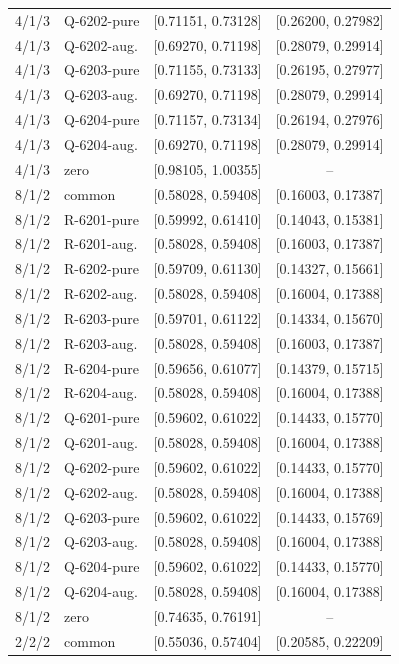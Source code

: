 {\begin{longtable}{rlcc}
4/1/3 & Q-6202-pure & [0.71151, 0.73128] & [0.26200, 0.27982] \\
4/1/3 & Q-6202-aug. & [0.69270, 0.71198] & [0.28079, 0.29914] \\
4/1/3 & Q-6203-pure & [0.71155, 0.73133] & [0.26195, 0.27977] \\
4/1/3 & Q-6203-aug. & [0.69270, 0.71198] & [0.28079, 0.29914] \\
4/1/3 & Q-6204-pure & [0.71157, 0.73134] & [0.26194, 0.27976] \\
4/1/3 & Q-6204-aug. & [0.69270, 0.71198] & [0.28079, 0.29914] \\
4/1/3 & zero & [0.98105, 1.00355] & -- \\
8/1/2 & common & [0.58028, 0.59408] & [0.16003, 0.17387] \\
8/1/2 & R-6201-pure & [0.59992, 0.61410] & [0.14043, 0.15381] \\
8/1/2 & R-6201-aug. & [0.58028, 0.59408] & [0.16003, 0.17387] \\
8/1/2 & R-6202-pure & [0.59709, 0.61130] & [0.14327, 0.15661] \\
8/1/2 & R-6202-aug. & [0.58028, 0.59408] & [0.16004, 0.17388] \\
8/1/2 & R-6203-pure & [0.59701, 0.61122] & [0.14334, 0.15670] \\
8/1/2 & R-6203-aug. & [0.58028, 0.59408] & [0.16003, 0.17387] \\
8/1/2 & R-6204-pure & [0.59656, 0.61077] & [0.14379, 0.15715] \\
8/1/2 & R-6204-aug. & [0.58028, 0.59408] & [0.16004, 0.17388] \\
8/1/2 & Q-6201-pure & [0.59602, 0.61022] & [0.14433, 0.15770] \\
8/1/2 & Q-6201-aug. & [0.58028, 0.59408] & [0.16004, 0.17388] \\
8/1/2 & Q-6202-pure & [0.59602, 0.61022] & [0.14433, 0.15770] \\
8/1/2 & Q-6202-aug. & [0.58028, 0.59408] & [0.16004, 0.17388] \\
8/1/2 & Q-6203-pure & [0.59602, 0.61022] & [0.14433, 0.15769] \\
8/1/2 & Q-6203-aug. & [0.58028, 0.59408] & [0.16004, 0.17388] \\
8/1/2 & Q-6204-pure & [0.59602, 0.61022] & [0.14433, 0.15770] \\
8/1/2 & Q-6204-aug. & [0.58028, 0.59408] & [0.16004, 0.17388] \\
8/1/2 & zero & [0.74635, 0.76191] & -- \\
2/2/2 & common & [0.55036, 0.57404] & [0.20585, 0.22209] \\

\end{longtable}}
